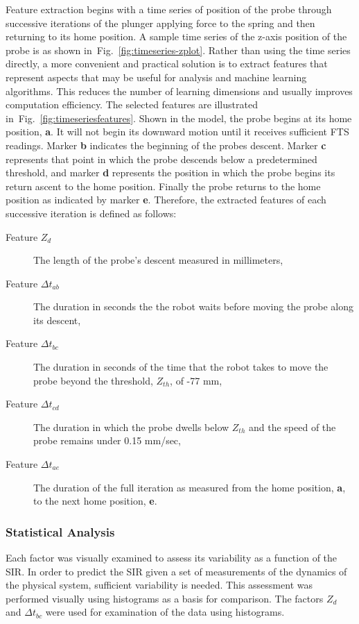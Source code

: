 Feature extraction begins with a time series of position of the probe through successive iterations of the plunger applying force to the spring and then returning to its home position.  A sample time series of the z-axis position of the probe is as shown in~Fig.~\ref{fig:timeseries-zplot}.  Rather than using the time series directly, a more convenient and practical solution is to extract features that represent aspects that may be useful for analysis and machine learning algorithms.  This reduces the number of learning dimensions and usually improves computation efficiency.  The selected features are illustrated in~Fig.~\ref{fig:timeseriesfeatures}.   Shown in the model, the probe begins at its home position, \textbf{a}.  It will not begin its downward motion until it receives sufficient FTS readings.  Marker \textbf{b} indicates the beginning of the probes descent.  Marker \textbf{c} represents that point in which the probe descends below a predetermined threshold, and marker \textbf{d} represents the position in which the probe begins its return ascent to the home position.  Finally the probe returns to the home position as indicated by marker \textbf{e}.  Therefore, the extracted features of each successive iteration is defined as follows:

\begin{description}
    \item[Feature $Z_d$] The length of the probe's descent measured in millimeters,
    \item[Feature $\Delta{t}_{ab}$] The duration in seconds the the robot waits before moving the probe along its descent,
    \item[Feature $\Delta{t}_{bc}$] The duration in seconds of the time that the robot takes to move the probe beyond the threshold, $Z_{th}$, of -77 mm,
    \item[Feature $\Delta{t}_{cd}$] The duration in which the probe dwells below $Z_{th}$ and the speed of the probe remains under 0.15 mm/sec,
    \item[Feature $\Delta{t}_{ae}$] The duration of the full iteration as measured from the home position, \textbf{a}, to the next home position, \textbf{e}.
\end{description}


\subsubsection{Statistical Analysis}\label{ftml-conf:sec:data:stats}
Each factor was visually examined to assess its variability as a function of the SIR.  In order to predict the SIR given a set of measurements of the dynamics of the physical system, sufficient variability is needed.  This assessment was performed visually using histograms as a basis for comparison.  The factors $Z_{d}$ and $\Delta{t}_{bc}$ were used for examination of the data using histograms.  


